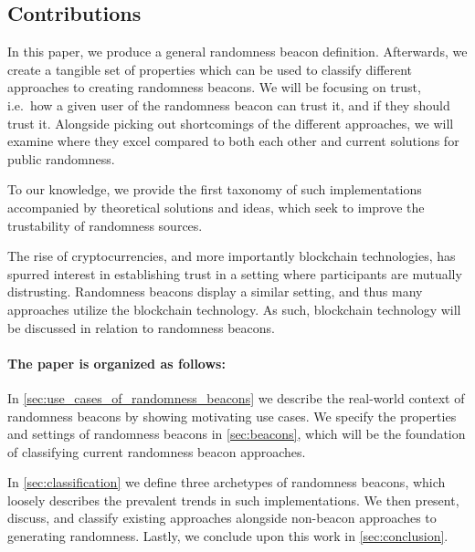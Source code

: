 \subsection*{Contributions}\label{subsec:contributions}
In this paper, we produce a general randomness beacon definition. Afterwards, we create a tangible set of properties which can be used to classify different approaches to creating randomness beacons.
We will be focusing on trust, i.e.\ how a given user of the randomness beacon can trust it, and if they should trust it.
Alongside picking out shortcomings of the different approaches, we will examine where they excel compared to both each other and current solutions for public randomness.

To our knowledge, we provide the first taxonomy of such implementations accompanied by theoretical solutions and ideas, which seek to improve the trustability of randomness sources.

The rise of cryptocurrencies, and more importantly blockchain technologies, has spurred interest in establishing trust in a setting where participants are mutually distrusting.
Randomness beacons display a similar setting, and thus many approaches utilize the blockchain technology.
As such, blockchain technology will be discussed in relation to randomness beacons.


\paragraph{The paper is organized as follows:}
In \cref{sec:use_cases_of_randomness_beacons} we describe the real-world context of randomness beacons by showing motivating use cases.
We specify the properties and settings of randomness beacons in \cref{sec:beacons}, which will be the foundation of classifying current randomness beacon approaches.

In \cref{sec:classification} we define three archetypes of randomness beacons, which loosely describes the prevalent trends in such implementations.
We then present, discuss, and classify existing approaches alongside non-beacon approaches to generating randomness.
Lastly, we conclude upon this work in \cref{sec:conclusion}.

